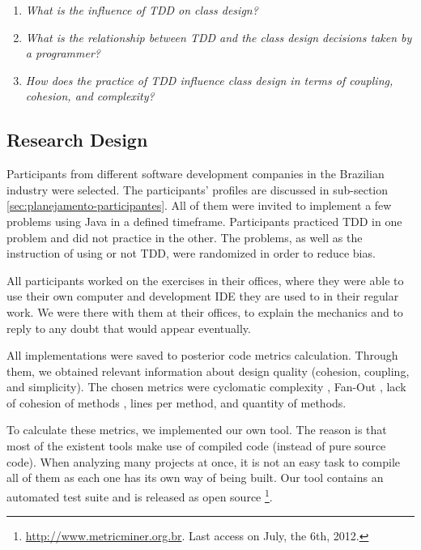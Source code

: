 \documentclass[times]{elsarticle}
\begin{document}
\begin{enumerate}

	\item \textit{What is the influence of TDD on class design?}

	\item \textit{What is the relationship between TDD and the class design decisions taken
	by a programmer?}

	\item \textit{How does the practice of TDD influence class design in terms of coupling, 
	cohesion, and complexity?}

\end{enumerate}

\subsection{Research Design}

Participants from different software development companies in the Brazilian
industry were selected. The participants' profiles are discussed in sub-section
\ref{sec:planejamento-participantes}. All of them were invited to implement
a few problems using Java in a defined timeframe. Participants practiced
TDD in one problem and did not practice in the other. The problems,
as well as the instruction of using or not TDD, were
randomized in order to reduce bias.

All participants worked on the exercises in their offices, where they were
able to use their own computer and development IDE they are used to in 
their regular work. We were there with them at their offices, to explain
the mechanics and to reply to any doubt that would appear eventually.

All implementations were saved to posterior code metrics calculation.
Through them, we obtained relevant information about design quality (cohesion, 
coupling, and simplicity). The chosen metrics were cyclomatic complexity \cite{mccabe},
Fan-Out \cite{lorenz}, lack of cohesion of methods \cite{lcom-hs}, lines per method,
and quantity of methods.

To calculate these metrics, we implemented our own tool. The reason is that
most of the existent tools make use of compiled code (instead of pure source
code). When analyzing many projects at once, it is not an easy task to compile all
of them as each one has its own way of being built.
Our tool contains an automated test suite and is released as open source
\footnote{\url{http://www.metricminer.org.br}. 
Last access on July, the 6th, 2012.}.
\end{document}
